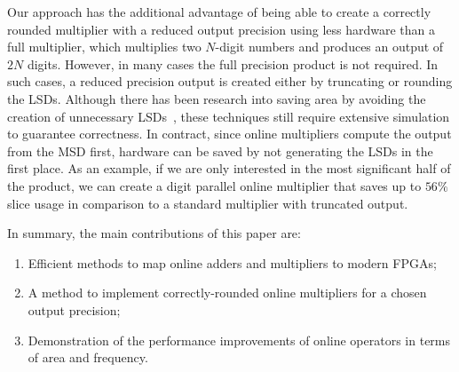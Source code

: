 \documentclass[conference]{IEEEtran}
\begin{document}
Our approach has the additional advantage of being able to create a correctly rounded multiplier with a reduced output precision using less hardware than a full multiplier, which multiplies two $N$-digit numbers and produces an output of $2N$ digits. However, in many cases the full precision product is not required. In such cases, a reduced precision output is created either by truncating or rounding the LSDs. Although there has been research into saving area by avoiding the creation of unnecessary LSDs~\cite{TheoTC}, these techniques still require extensive simulation to guarantee correctness. In contract, since online multipliers compute the output from the MSD first, hardware can be saved by not generating the LSDs in the first place. As an example, if we are only interested in the most significant half of the product, we can create a digit parallel online multiplier that saves up to $56\%$ slice usage in comparison to a standard multiplier with truncated output.



In summary, the main contributions of this paper are:
\begin{enumerate}
    \item Efficient methods to map online adders and multipliers to modern FPGAs;
    \item A method to implement correctly-rounded online multipliers for a chosen output precision;
    \item Demonstration of the performance improvements of online operators in terms of area and frequency.
\end{enumerate}

\end{document}
